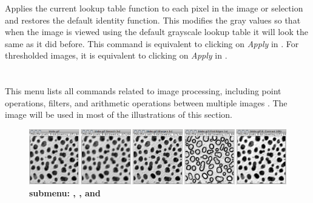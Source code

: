 

\subsubsection{\protect{}\label{sub:Apply-LUT}}

Applies the current lookup table function to each pixel in the image
or selection and restores the default identity function. This modifies
the gray values so that when the image is viewed using the default
grayscale lookup table it will look the same as it did before. This
command is equivalent to clicking on \emph{Apply} in .
For thresholded images, it is equivalent to clicking on \emph{Apply}
in . 



\clearpage{}


\section{\protect{}\label{sec:Process}}

This menu lists all commands related to image processing,
including point operations, filters, and arithmetic operations between
multiple images \cite{Burger:2008p14082}. The  image will be used in most of the illustrations of this section.
\begin{figure}[h]
\noindent \includegraphics[width=1\columnwidth]{images/SmoothSharpenFindEdgesEContrast}\caption{\textbf{\protect{} submenu:
\protect{}, \protect{},
\protect{} and \protect{}}}
\end{figure}



